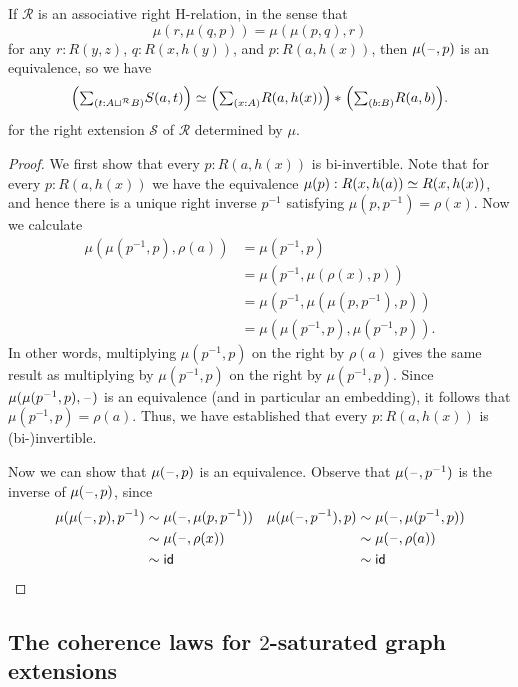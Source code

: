\begin{cor}
If $\mathcal{R}$ is an associative right H-relation, in the sense that
\begin{equation*}
\mu(r,\mu(q,p))=\mu(\mu(p,q),r)
\end{equation*}
for any $r:R(y,z)$, $q:R(x,h(y))$, and $p:R(a,h(x))$, then $\mu(\mathord{\hspace{1pt}\text{--}\hspace{1pt}},p)$ is an equivalence, so we have
\begin{equation*}
\eqv{\Big(\sm{t:A\sqcup^{\mathcal{R}} B}S(a,t)\Big)}{\join{\Big(\sm{x:A}R(a,h(x))\Big)}{\Big(\sm{b:B}R(a,b)\Big)}}.
\end{equation*}
for the right extension $\mathcal{S}$ of $\mathcal{R}$ determined by $\mu$.
\end{cor}

\begin{proof}
We first show that every $p:R(a,h(x))$ is bi-invertible. Note that for every $p:R(a,h(x))$ we have the equivalence $\mu(p):R(x,h(a))\simeq R(x,h(x))$, and hence there is a unique right inverse $p^{-1}$ satisfying $\mu(p,p^{-1})=\rho(x)$. Now we calculate
\begin{align*}
\mu(\mu(p^{-1},p),\rho(a)) & = \mu(p^{-1},p) \\
& = \mu(p^{-1},\mu(\rho(x),p)) \\
& = \mu(p^{-1},\mu(\mu(p,p^{-1}),p)) \\
& = \mu(\mu(p^{-1},p),\mu(p^{-1},p)).
\end{align*}
In other words, multiplying $\mu(p^{-1},p)$ on the right by $\rho(a)$ gives the same result as multiplying by $\mu(p^{-1},p)$ on the right by $\mu(p^{-1},p)$. Since $\mu(\mu(p^{-1},p),\mathord{\hspace{1pt}\text{--}\hspace{1pt}})$ is an equivalence (and in particular an embedding), it follows that $\mu(p^{-1},p)=\rho(a)$. Thus, we have established that every $p:R(a,h(x))$ is (bi-)invertible. 

Now we can show that $\mu(\mathord{\hspace{1pt}\text{--}\hspace{1pt}},p)$ is an equivalence. Observe that $\mu(\mathord{\hspace{1pt}\text{--}\hspace{1pt}},p^{-1})$ is the inverse of $\mu(\mathord{\hspace{1pt}\text{--}\hspace{1pt}},p)$, since
\begin{align*}
\mu(\mu(\mathord{\hspace{1pt}\text{--}\hspace{1pt}},p),p^{-1}) & \sim \mu(\mathord{\hspace{1pt}\text{--}\hspace{1pt}},\mu(p,p^{-1})) & \mu(\mu(\mathord{\hspace{1pt}\text{--}\hspace{1pt}},p^{-1}),p) & \sim \mu(\mathord{\hspace{1pt}\text{--}\hspace{1pt}},\mu(p^{-1},p)) \\
& \sim \mu(\mathord{\hspace{1pt}\text{--}\hspace{1pt}},\rho(x)) & & \sim \mu(\mathord{\hspace{1pt}\text{--}\hspace{1pt}},\rho(a)) \\
& \sim \mathsf{id}_{} & & \sim \mathsf{id}_{} \qedhere
\end{align*}
\end{proof}

\subsection{The coherence laws for $2$-saturated graph extensions}

